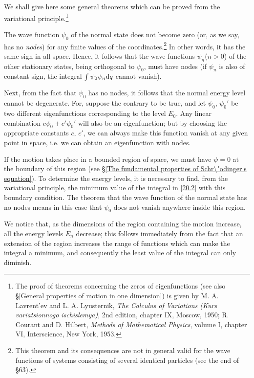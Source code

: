 We shall give here some general theorems which can be proved from the variational principle.\footnote{The proof of theorems concerning the zeros of eigenfunctions (see also \S\ref{General properties of motion in one dimension}) is given by M. A. Lavrent’ev and L. A. Lyusternik, \textit{The Calculus of Variations (Kurs variatsionnogo ischislemya)}, 2nd edition, chapter IX, Moscow, 1950; R. Courant and D. Hilbert, \textit{Methods of Mathematical Physics}, volume I, chapter VI, Interscience, New York, 1953.}

The wave function $\psi_0$ of the normal state does not become zero (or, as we say, has no \textit{nodes}) for any finite values of the coordinates.\footnote{This theorem and its consequences are not in general valid for the wave functions of systems consisting of several identical particles (see the end of \S63).} In other words, it has the same sign in all space. Hence, it follows that the wave functions $\psi_n$($ n>0 $) of the other stationary states, being orthogonal to $\psi_0$, must have nodes (if $\psi_n$ is also of constant sign, the integral $ \int\psi_0\psi_n\mathrm{d} q $ cannot vanish).

Next, from the fact that $\psi_0$ has no nodes, it follows that the normal energy level cannot be degenerate. For, suppose the contrary to be true, and let $\psi_0$, $\psi_0'$ be two different eigenfunctions corresponding to the level $ E_0 $. Any linear combination $ c\psi_0+c'\psi_0' $ will also be an eigenfunction; but by choosing the appropriate constants $ c $, $ c' $, we can always make this function vanish at any given point in space, i.e. we can obtain an eigenfunction with nodes.

If the motion takes place in a bounded region of space, we must have $ \psi=0 $ at the boundary of this region (see \S\ref{The fundamental properties of Schr\"odinger's equation}). To determine the energy levels, it is necessary to find, from the variational principle, the minimum value of the integral in \eqref{20.2} with this boundary condition. The theorem that the wave function of the normal state has no nodes means in this case that $\psi_0$ does not vanish anywhere inside this region.

We notice that, as the dimensions of the region containing the motion increase, all the energy levels $ E_n $ decrease; this follows immediately from the fact that an extension of the region increases the range of functions which can make the integral a minimum, and consequently the least value of the integral can only diminish.

